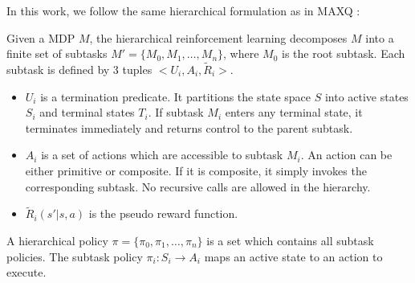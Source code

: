 In this work, we follow the same hierarchical formulation as in MAXQ \cite{MaxQJ}:
\begin{definition}
    Given a MDP $M$, the hierarchical reinforcement learning decomposes $M$ into a finite
    set of subtasks $M' = \{M_0, M_1, \dots, M_n\}$, where $M_0$ is the root subtask. 
    Each subtask is defined by 3 tuples $<U_i, A_i, \tilde{R}_i>$. 
    \begin{itemize}
    \item $U_i$ is a termination predicate. It partitions the state space $S$ into active states $S_i$ and
                terminal states $T_i$. If subtask $M_i$ enters any terminal state, it terminates immediately
                and returns control to the parent subtask. 
    \item $A_i$ is a set of actions which are accessible to subtask $M_i$. An action can be either primitive or composite.
                If it is composite, it simply invokes the corresponding subtask. No recursive calls 
                are allowed in the hierarchy.
    \item $\tilde{R}_i(s'|s, a)$ is the pseudo reward function. 
    \end{itemize}
\end{definition}
A hierarchical policy $\pi = \{\pi_0, \pi_1, \dots, \pi_n\}$ is a set which contains all subtask policies. 
The subtask policy $\pi_i: S_i \rightarrow A_i$ maps an active state to an action to execute.



